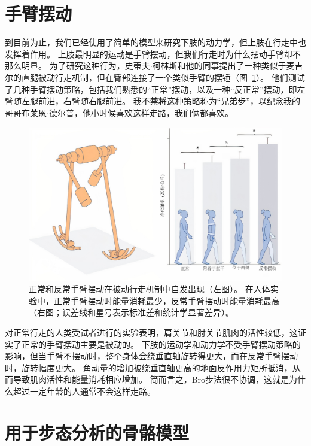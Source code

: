 \section{手臂摆动}

到目前为止，我们已经使用了简单的模型来研究下肢的动力学，但上肢在行走中也发挥着作用。
上肢最明显的运动是手臂摆动，但我们行走时为什么摆动手臂却不那么明显。
为了研究这种行为，史蒂夫$\cdot$柯林斯和他的同事提出了一种类似于麦吉尔的直腿被动行走机制，但在臀部连接了一个类似手臂的摆锤（图~\ref{fig:2_16}）。
他们测试了几种手臂摆动策略，包括我们熟悉的“正常”摆动，以及一种“反正常”摆动，即左臂随左腿前进，右臂随右腿前进。
我不禁将这种策略称为“兄弟步”，以纪念我的哥哥布莱恩$\cdot$德尔普，他小时候喜欢这样走路，我们俩都喜欢。


\begin{figure}[!htb]
	\centering
	\includegraphics[width=1.0\linewidth]{chap2/2_16}
	\caption{正常和反常手臂摆动在被动行走机制中自发出现（左图）。
		在人体实验中，正常手臂摆动时能量消耗最少，反常手臂摆动时能量消耗最高（右图；误差线和星号表示标准差和统计学显著差异）\cite{collins2009dynamic}。 \label{fig:2_16}}
\end{figure}


对正常行走的人类受试者进行的实验表明，肩关节和肘关节肌肉的活性较低，这证实了正常的手臂摆动主要是被动的。
下肢的运动学和动力学不受手臂摆动策略的影响，但当手臂不摆动时，整个身体会绕垂直轴旋转得更大，而在反常手臂摆动时，旋转幅度更大。
角动量的增加被绕垂直轴更高的地面反作用力矩所抵消，从而导致肌肉活性和能量消耗相应增加。
简而言之，Bro步法很不协调，这就是为什么超过一定年龄的人通常不会这样走路。


\section{用于步态分析的骨骼模型}

